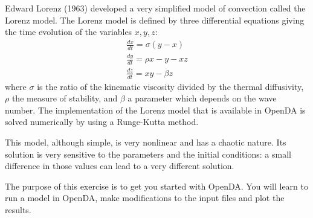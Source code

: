 \documentclass[a4paper,10pt]{article}
\begin{document}
Edward Lorenz (1963) developed
a very simplified model of convection called the Lorenz model. The Lorenz model
is defined by three differential equations giving the time evolution of the
variables $x,y,z$:
\begin{eqnarray}
   \frac{dx}{dt}=\sigma(y-x) \\
   \frac{dy}{dt}=\rho x - y -x z \\
   \frac{dz}{dt}=x y - \beta z
\end{eqnarray}
where $\sigma$ is the ratio of the kinematic viscosity divided by the thermal
diffusivity, $\rho$ the measure of stability, and $\beta$ a parameter which
depends on the wave number.
The implementation of the Lorenz model that is available in OpenDA is solved numerically by using a Runge-Kutta method.

This model, although simple, is very nonlinear and has a chaotic nature.  Its
solution is very sensitive to the parameters and the initial conditions: a
small difference in those values can lead to a very different solution.

The purpose of this exercise is to get you started with OpenDA. You will learn
to run a model in OpenDA, make modifications to the input files and plot the
results.
\end{document}

